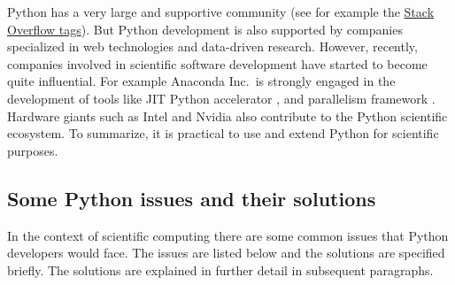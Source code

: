Python has a very large and supportive community (see for example the
\href{http://stackoverflow.com/tags}{Stack Overflow tags}).
%
But Python development is also supported by companies specialized in web
technologies and data-driven research. However, recently, companies involved in
scientific software development have started to become quite influential. For
example Anaconda Inc.\ is strongly engaged in the development of tools like JIT
Python accelerator , and parallelism framework .
Hardware giants such as Intel and Nvidia also contribute to the Python
scientific ecosystem.
%
To summarize, it is practical to use and extend Python for scientific purposes.

\subsection{Some Python issues and their solutions}

In the context of scientific computing there are some common issues that Python
developers would face. The issues are listed below and the solutions are
specified briefly. The solutions are explained in further detail in subsequent
paragraphs.

